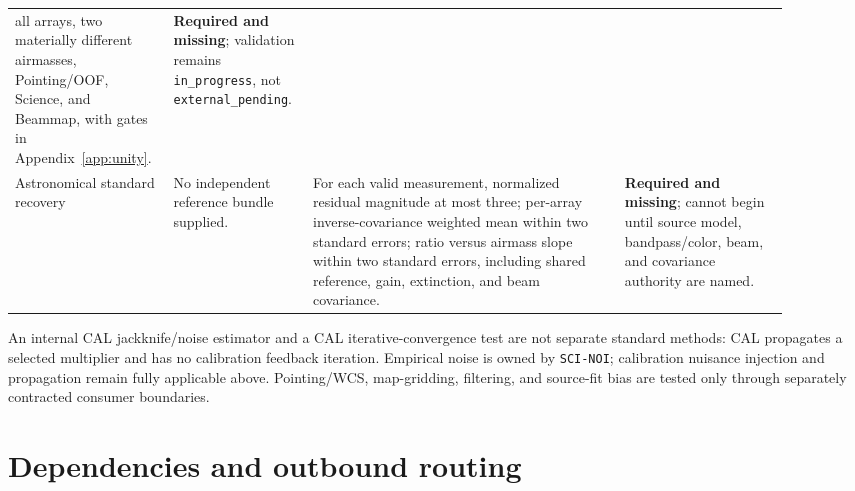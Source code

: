 \documentclass[11pt]{article}
\newcommand{\code}[1]{\nolinkurl{#1}}
\begin{document}
\begin{longtable}{L{0.17\linewidth}L{0.15\linewidth}L{0.38\linewidth}L{0.20\linewidth}}
all arrays, two materially different airmasses, Pointing/OOF, Science, and
Beammap, with gates in Appendix~\ref{app:unity}. & \textbf{Required and
missing}; validation remains \code{in_progress}, not
\code{external_pending}.\\
Astronomical standard recovery & No independent reference bundle supplied. &
For each valid measurement, normalized residual magnitude at most three;
per-array inverse-covariance weighted mean within two standard errors; ratio
versus airmass slope within two standard errors, including shared reference,
gain, extinction, and beam covariance. & \textbf{Required and missing};
cannot begin until source model, bandpass/color, beam, and covariance authority
are named.\\
\bottomrule
\end{longtable}

An internal CAL jackknife/noise estimator and a CAL iterative-convergence test
are not separate standard methods: CAL propagates a selected multiplier and
has no calibration feedback iteration.  Empirical noise is owned by
\code{SCI-NOI}; calibration nuisance injection and propagation remain fully
applicable above.  Pointing/WCS, map-gridding, filtering, and source-fit bias
are tested only through separately contracted consumer boundaries.

\section{Dependencies and outbound routing}
\end{document}
